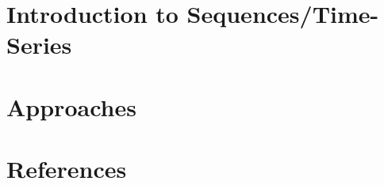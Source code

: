 \section[Seq]{Introduction to Sequences/Time-Series}



\section[App]{Approaches}


\section[Refs]{References}


